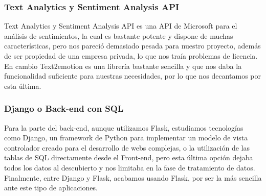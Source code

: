 			\subsubsection*{Text Analytics y Sentiment Analysis API}
			Text Analytics y Sentiment Analysis API es una API de Microsoft para el análisis de sentimientos, la cual es bastante potente y dispone de muchas características, pero nos pareció demasiado pesada para nuestro proyecto, además de ser propiedad de una empresa privada, lo que nos traía problemas de licencia. En cambio Text2emotion es una librería bastante sencilla y que nos daba la funcionalidad suficiente para nuestras necesidades, por lo que nos decantamos por esta última.
								
			\subsubsection*{Django o Back-end con SQL}
			
			Para la parte del back-end, aunque utilizamos Flask, estudiamos tecnologías como Django, un framework de Python para implementar un modelo de vista controlador creado para el desarrollo de webs complejas, o la utilización de las tablas de SQL directamente desde el Front-end, pero esta última opción dejaba todos los datos al descubierto y nos limitaba en la fase de tratamiento de datos. Finalmente, entre Django y Flask, acabamos usando Flask, por ser la más sencilla ante este tipo de aplicaciones.
	



